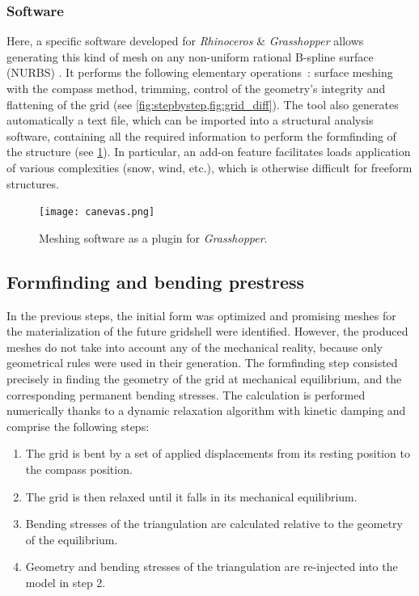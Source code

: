 \subsubsection{Software}
Here, a specific software developed for \emph{Rhinoceros} \& \emph{Grasshopper} allows generating this kind of mesh on any non-uniform rational B-spline surface (NURBS) \citep{DuPeloux2011}. It performs the following elementary operations~: surface meshing with the compass method, trimming, control of the geometry’s integrity and flattening of the grid (see \cref{fig:stepbystep,fig:grid_diff}). The tool also generates automatically a text file, which can be imported into a structural analysis software, containing all the required information to perform the formfinding of the structure (see \cref{fig:canevas}). In particular, an add-on feature facilitates loads application of various complexities (snow, wind, etc.), which is otherwise difficult for freeform structures.
\begin{figure}[h]
	\centering
	\texttt{[image: canevas.png]}
	\caption{Meshing software as a plugin for \emph{Grasshopper}.}
	\label{fig:canevas}
\end{figure}

\subsection{Formfinding and bending prestress}
In the previous steps, the initial form was optimized and promising meshes for the materialization of the future gridshell were identified. However, the produced meshes do not take into account any of the mechanical reality, because only geometrical rules were used in their generation. The formfinding step consisted precisely in finding the geometry of the grid at mechanical equilibrium, and the corresponding permanent bending stresses. The calculation is performed numerically thanks to a dynamic relaxation algorithm with kinetic damping \cite{Barnes1975} and comprise the following steps:
\begin{enumerate}
\item The grid is bent by a set of applied displacements from its resting position to the compass position.
\item The grid is then relaxed until it falls in its mechanical equilibrium.
\item Bending stresses of the triangulation are calculated relative to the geometry of the equilibrium.
\item Geometry and bending stresses of the triangulation are re-injected into the model in step 2.
\end{enumerate}

